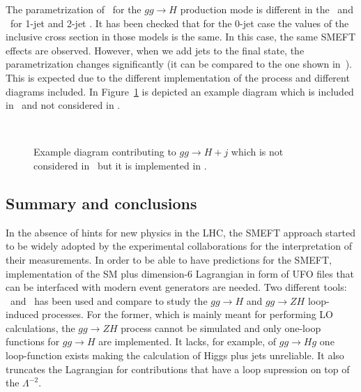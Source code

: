     
    
The parametrization of \cpG\ for the $gg\to H$ production mode is different in the \SMEFTsim\ and \SMEFTatNLO\ for 1-jet and 2-jet . It has been checked that for the 0-jet case the values of the inclusive cross section in those models is the same. In this case, the same SMEFT effects are observed. However, when we add jets to the final state, the parametrization changes significantly (it can be compared to the one shown in~\cite{ATL-PHYS-PUB-2019-042}). This is expected due to the different implementation of the process and different diagrams included. In Figure~\ref{fig:higgseft:diagram} is depicted an example diagram which is included in \SMEFTatNLO\ and not considered in \SMEFTsim.

\begin{figure}
  \centering
    \\
    \caption{ Example diagram contributing to $gg\to H +j$ which is not considered in \SMEFTsim\ but it is implemented in \SMEFTatNLO.}
    \label{fig:higgseft:diagram}
\end{figure}

\subsection{Summary and conclusions}
In the absence of hints for new physics in the LHC, the SMEFT approach started to be widely adopted by the experimental collaborations for the interpretation of their measurements. In order to be able to have predictions for the SMEFT, implementation of the SM plus dimension-6 Lagrangian in form of UFO files that can be interfaced with modern event generators are needed. Two different tools: \SMEFTsim\ and \SMEFTatNLO\ has been used and compare to study the $gg\to H$ and $gg\to ZH$ loop-induced processes. For the former, which is mainly meant for performing LO calculations, the $gg\to ZH$ process cannot be simulated and only one-loop functions for $gg\to H$ are implemented. It lacks, for example, of $gg\to Hg$ one loop-function exists making the calculation of Higgs plus jets unreliable. It also truncates the Lagrangian for contributions that have a loop supression on top of the $\Lambda^{-2}$.


